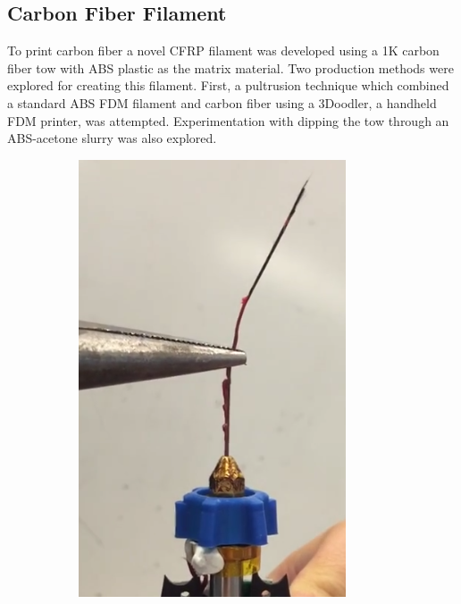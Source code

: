 

\subsection*{Carbon Fiber Filament}

To print carbon fiber a novel CFRP filament was developed using a 1K carbon fiber tow with ABS plastic as the matrix material. Two production methods were explored for creating this filament. First, a pultrusion technique which combined a standard ABS FDM filament and carbon fiber using a 3Doodler, a handheld FDM printer, was attempted. Experimentation with dipping the tow through an ABS-acetone slurry was also explored.

\begin{figure}[t]
        \centering
        \begin{subfigure}[b]{0.4\linewidth}
                \includegraphics[width=\linewidth]{./figures/pultrusion-vid}

\end{subfigure}
\end{figure}
